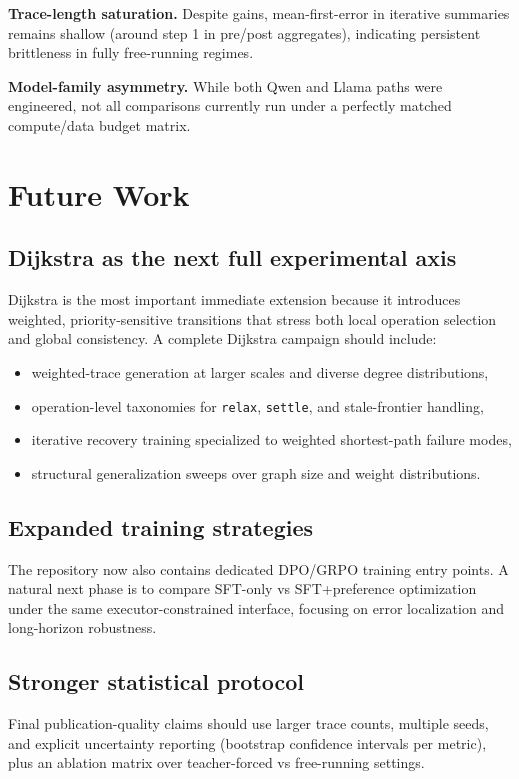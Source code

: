 \documentclass[sigplan,screen]{acmart}
\begin{document}
\textbf{Trace-length saturation.}
Despite gains, mean-first-error in iterative summaries remains shallow (around step 1 in pre/post aggregates), indicating persistent brittleness in fully free-running regimes.

\textbf{Model-family asymmetry.}
While both Qwen and Llama paths were engineered, not all comparisons currently run under a perfectly matched compute/data budget matrix.

\section{Future Work}
\subsection{Dijkstra as the next full experimental axis}
Dijkstra is the most important immediate extension because it introduces weighted, priority-sensitive transitions that stress both local operation selection and global consistency.
A complete Dijkstra campaign should include:
\begin{itemize}
  \item weighted-trace generation at larger scales and diverse degree distributions,
  \item operation-level taxonomies for \texttt{relax}, \texttt{settle}, and stale-frontier handling,
  \item iterative recovery training specialized to weighted shortest-path failure modes,
  \item structural generalization sweeps over graph size and weight distributions.
\end{itemize}

\subsection{Expanded training strategies}
The repository now also contains dedicated DPO/GRPO training entry points.
A natural next phase is to compare SFT-only vs SFT+preference optimization under the same executor-constrained interface, focusing on error localization and long-horizon robustness.

\subsection{Stronger statistical protocol}
Final publication-quality claims should use larger trace counts, multiple seeds, and explicit uncertainty reporting (bootstrap confidence intervals per metric), plus an ablation matrix over teacher-forced vs free-running settings.
\end{document}
